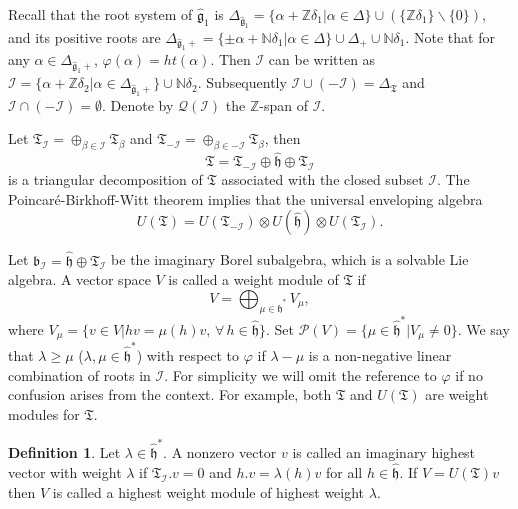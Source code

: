 \documentclass[11pt]{amsproc}
\theoremstyle{definition}
\newtheorem{definition}[theorem]{Definition}
\theoremstyle{remark}
\numberwithin{equation}{section} \errorcontextlines=0
\begin{document}
Recall \cite{VG} that the root system of $\hat{\mathfrak g}_1$ is
$\Delta_{\hat{\mathfrak
g}_1}=\{\alpha+\mathbb{Z}\delta_1|\alpha\in\Delta\}\cup(\{\mathbb{Z}\delta_1\}\backslash\{0\})$,
and its positive roots are $\Delta_{\hat{\mathfrak
g}_1+}=\{\pm\alpha+\mathbb{N}\delta_1|\alpha\in\Delta\}\cup\Delta_+\cup
\mathbb N\delta_1$. Note that for any
$\alpha\in\Delta_{\hat{\mathfrak g}_1+}$,
$\varphi(\alpha)=ht(\alpha)$. Then $\mathcal {I}$ can be written as
$\mathcal
{I}=\{\alpha+\mathbb{Z}\delta_2|\alpha\in\Delta_{\hat{\mathfrak
g}_1+}\}\cup\mathbb{N}\delta_2$. Subsequently
$\mathcal {I}\cup(-\mathcal {I})=\Delta_{\mathfrak T}$ and $\mathcal
{I}\cap(-\mathcal {I})=\emptyset$. Denote by $\mathcal Q(\mathcal
I)$ the $\mathbb Z$-span of $\mathcal I$.

Let $\mathfrak T_{\mathcal {I}}=\oplus_{\beta\in\mathcal {I}}
\mathfrak T_{\beta}$ and $\mathfrak
T_{-\mathcal{I}}=\oplus_{\beta\in-\mathcal {I}} \mathfrak
T_{\beta}$, then
\begin{equation}\label{e:triangle}
\mathfrak T=\mathfrak T_{-\mathcal {I}}\oplus
\hat{\mathfrak h}\oplus\mathfrak T_{\mathcal {I}}
\end{equation}
 is a triangular
decomposition of $\mathfrak T$ associated with the closed subset
$\mathcal {I}$. The Poincar\'e-Birkhoff-Witt theorem implies that the
universal enveloping algebra
$$U(\mathfrak T)=U(\mathfrak T_{-\mathcal {I}})\otimes
U(\hat{\mathfrak h})\otimes U(\mathfrak T_{\mathcal {I}}).
$$

Let ${\mathfrak b}_{\mathcal
{I}}=\hat{\mathfrak h}\oplus\mathfrak T_{\mathcal {I}}$ be
the imaginary Borel subalgebra, which is a solvable Lie algebra.
A vector space $V$ is called a weight module of $\mathfrak T$ if
$$V=\bigoplus_{\mu\in\hat{\mathfrak h}^*}V_{\mu},$$
where $V_{\mu}=\{v\in V|hv=\mu(h)v, \, \forall \, h\in\hat{\mathfrak
h}\}$.  Set $\mathcal {P}(V)=\{\mu\in\hat{\mathfrak
h}^*|V_{\mu}\neq 0\}$. We say that
$\lambda\geq\mu$ ($\lambda,\mu\in\hat{\mathfrak h}^*$)
with respect to $\varphi$ if $\lambda-\mu$ is a
non-negative linear combination of roots in
${\mathcal I}$. For simplicity we will omit the reference to
$\varphi$ if no confusion arises from the context. For example,
both $\mathfrak T$ and $U(\mathfrak T)$ are weight modules for
$\mathfrak T$.

\begin{definition}
Let $\lambda\in\hat{\mathfrak h}^{\ast}$. A nonzero vector $v$ is
called an imaginary highest vector with weight $\lambda$ if
$\mathfrak T_{\mathcal {I}}.v=0$ and $h.v=\lambda(h)v$ for all
$h\in\hat{\mathfrak h}$. If $V=U(\mathfrak T)v$ then $V$ is called a
highest weight module of highest weight $\lambda$.
\end{definition}
\end{document}
